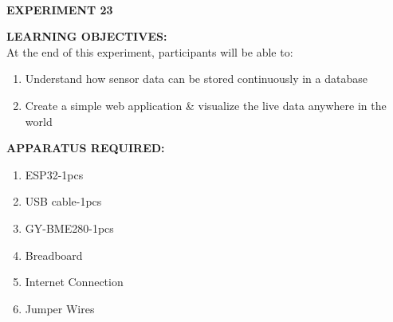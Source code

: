 \documentclass[12pt,a4paper]{article}
\begin{document}
\begin{center}

\textbf{\large \\EXPERIMENT 23 }\\[6pt]
\end{center}

\textbf{\large LEARNING OBJECTIVES:}\\[3pt]
At the end of this experiment, participants will be able to:\vspace{-6mm}\begin{enumerate}
 \setlength\itemsep{-0.3em}
\item Understand how sensor data can be stored continuously in a database
\item Create a simple web application \& visualize the live data anywhere in the world
\end{enumerate}

\textbf{\large APPARATUS REQUIRED:}\\
\vspace{-3mm}
\begin{enumerate}
 \setlength\itemsep{-0.3em}
\item ESP32-1pcs 
\item USB cable-1pcs
\item GY-BME280-1pcs
\item Breadboard
\item Internet Connection
\item Jumper Wires
\end{enumerate}
\end{document}
